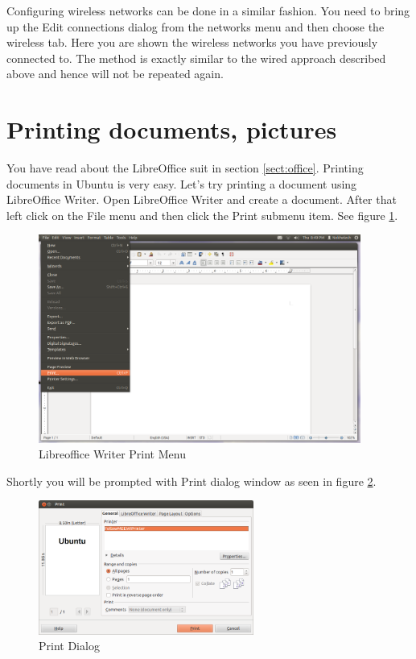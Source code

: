 \par \noindent Configuring wireless networks can be done in a similar fashion. You need to bring up the Edit connections dialog from the networks menu and then choose the wireless tab. Here you are shown the wireless networks you have previously connected to. The method is exactly similar to the wired approach described above and hence will not be repeated again. \\

\section{Printing documents, pictures} 
You have read about the LibreOffice suit in section \ref{sect:office}. Printing documents in Ubuntu is very easy. Let's try printing a document using LibreOffice Writer. Open LibreOffice Writer and create a document. After that left click on the File menu and then click the Print submenu item. See figure \ref{fig:print1}. \\

\begin{figure}[h!]	
	\centering
	\includegraphics[width=300pt]{./images/basic-tasks/print1.png}
	\caption{Libreoffice Writer Print Menu}	
	\label{fig:print1}		
\end{figure}

\par \noindent Shortly you will be prompted with Print dialog window as seen in figure \ref{fig:print2}. \\

\begin{figure}[h!]	
	\centering
	\includegraphics[width=200pt]{./images/basic-tasks/print2.png}
	\caption{Print Dialog}	
	\label{fig:print2}		
\end{figure}

